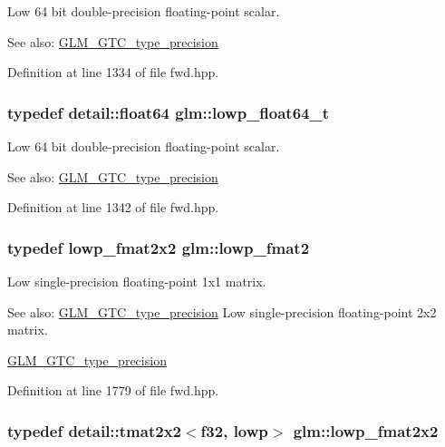 Low 64 bit double-precision floating-point scalar. \begin{Desc}
\item[See also:]\hyperlink{group__gtc__type__precision}{GLM\_\-GTC\_\-type\_\-precision} \end{Desc}


Definition at line 1334 of file fwd.hpp.\hypertarget{group__gtc__type__precision_gc9d64f4e69d6c2eade41a848077866b5}{
\subsubsection[lowp\_\-float64\_\-t]{\setlength{\rightskip}{0pt plus 5cm}typedef detail::float64 {\bf glm::lowp\_\-float64\_\-t}}}
\label{group__gtc__type__precision_gc9d64f4e69d6c2eade41a848077866b5}


Low 64 bit double-precision floating-point scalar. \begin{Desc}
\item[See also:]\hyperlink{group__gtc__type__precision}{GLM\_\-GTC\_\-type\_\-precision} \end{Desc}


Definition at line 1342 of file fwd.hpp.\hypertarget{group__gtc__type__precision_g9bafb192cb7327d543ad55be2e6e675c}{
\subsubsection[lowp\_\-fmat2]{\setlength{\rightskip}{0pt plus 5cm}typedef lowp\_\-fmat2x2 {\bf glm::lowp\_\-fmat2}}}
\label{group__gtc__type__precision_g9bafb192cb7327d543ad55be2e6e675c}


Low single-precision floating-point 1x1 matrix. \begin{Desc}
\item[See also:]\hyperlink{group__gtc__type__precision}{GLM\_\-GTC\_\-type\_\-precision} Low single-precision floating-point 2x2 matrix. 

\hyperlink{group__gtc__type__precision}{GLM\_\-GTC\_\-type\_\-precision} \end{Desc}


Definition at line 1779 of file fwd.hpp.\hypertarget{group__gtc__type__precision_g99367a30c64035d7e7f76410105d10e3}{
\subsubsection[lowp\_\-fmat2x2]{\setlength{\rightskip}{0pt plus 5cm}typedef detail::tmat2x2$<$f32, lowp$>$ {\bf glm::lowp\_\-fmat2x2}}}
\label{group__gtc__type__precision_g99367a30c64035d7e7f76410105d10e3}


